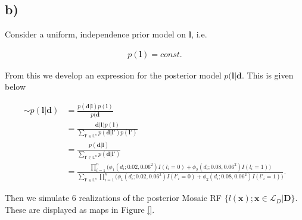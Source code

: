 \documentclass{article}
\newcommand{\vect}[1]{\ensuremath{\boldsymbol{\mathbf{#1} }}}
\newcommand{\domain}[1]{\ensuremath{\mathcal{#1}}}
\begin{document}
\subsection*{b)}

Consider a uniform, independence prior model on $\vect l$, i.e.

\begin{align*}
    p(\vect l) = const.
\end{align*}

From this we develop an expression for the posterior model $p(\vect l | \vect d$. This is given below

\begin{align*}
    [\vect l | \vect d] \sim p(\vect l | \vect d) &= \frac{p(\vect d| \vect l)p(\vect l)}{p(\vect d}\\
    &= \frac{\vect d |\vect l) p(\vect l)}{\sum_{\vect l' \in \mathbb{L}^n}p(\vect d| \vect l') p(\vect l')}\\
    &= \frac{p(\vect d| \vect l)}{\sum_{\vect l' \in \mathbb{L}^n} p (\vect d | \vect l')}\\
    &= \frac{\prod_{i=1}^n \bigg( \phi_1(d_i;0.02, 0.06^2)I(l_i=0)+\phi_2(d_i;0.08,0.06^2)I(l_i=1)\bigg)}{\sum_{\vect l' \in \mathbb{L}^n} \prod_{i=1}^n \bigg( \phi_1(d_i;0.02, 0.06^2)I(l'_i=0)+\phi_2(d_i;0.08,0.06^2)I(l'_i=1)\bigg)}.
\end{align*}

Then we simulate $6$ realizations of the posterior Mosaic RF $\{l(\vect x); \vect x \in \domain L_D| \vect D\}$. These are  displayed as maps in Figure \ref{}. 
\end{document}
